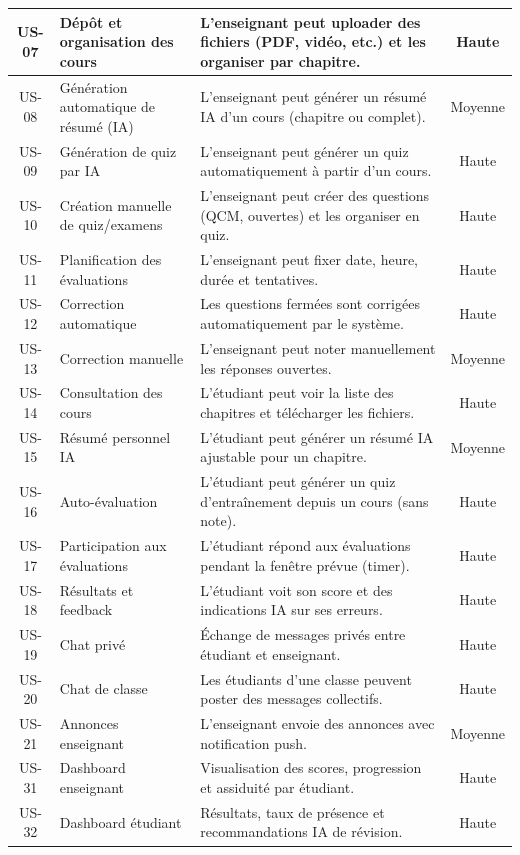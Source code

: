\begin{xltabular}{\textwidth}{|c|>{\raggedright\arraybackslash}p{4cm}|X|c|}
US-07 & Dépôt et organisation des cours & L'enseignant peut uploader des fichiers (PDF, vidéo, etc.) et les organiser par chapitre. & Haute \\
\hline
US-08 & Génération automatique de résumé (IA) & L'enseignant peut générer un résumé IA d'un cours (chapitre ou complet). & Moyenne \\
\hline
US-09 & Génération de quiz par IA & L'enseignant peut générer un quiz automatiquement à partir d'un cours. & Haute \\
\hline
US-10 & Création manuelle de quiz/examens & L'enseignant peut créer des questions (QCM, ouvertes) et les organiser en quiz. & Haute \\
\hline
US-11 & Planification des évaluations & L'enseignant peut fixer date, heure, durée et tentatives. & Haute \\
\hline
US-12 & Correction automatique & Les questions fermées sont corrigées automatiquement par le système. & Haute \\
\hline
US-13 & Correction manuelle & L'enseignant peut noter manuellement les réponses ouvertes. & Moyenne \\
\hline
US-14 & Consultation des cours & L'étudiant peut voir la liste des chapitres et télécharger les fichiers. & Haute \\
\hline
US-15 & Résumé personnel IA & L'étudiant peut générer un résumé IA ajustable pour un chapitre. & Moyenne \\
\hline
US-16 & Auto-évaluation & L'étudiant peut générer un quiz d'entraînement depuis un cours (sans note). & Haute \\
\hline
US-17 & Participation aux évaluations & L'étudiant répond aux évaluations pendant la fenêtre prévue (timer). & Haute \\
\hline
US-18 & Résultats et feedback & L'étudiant voit son score et des indications IA sur ses erreurs. & Haute \\
\hline
US-19 & Chat privé & Échange de messages privés entre étudiant et enseignant. & Haute \\
\hline
US-20 & Chat de classe & Les étudiants d'une classe peuvent poster des messages collectifs. & Haute \\
\hline
US-21 & Annonces enseignant & L'enseignant envoie des annonces avec notification push. & Moyenne \\
\hline
US-31 & Dashboard enseignant & Visualisation des scores, progression et assiduité par étudiant. & Haute \\
\hline
US-32 & Dashboard étudiant & Résultats, taux de présence et recommandations IA de révision. & Haute \\

\end{xltabular}

